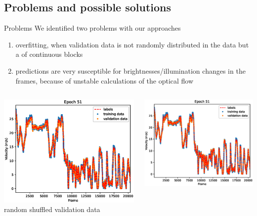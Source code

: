 \subsection{Problems and possible solutions}
\begin{frame}{Problems}
We identified two problems with our approaches
\begin{enumerate}
	\item overfitting, when validation data is not randomly distributed in the data but a of continuous blocks
	\item predictions are very susceptible for brightnesses/illumination changes in the frames, because of unstable calculations of the optical flow
\end{enumerate}
\begin{columns}[c]
	\begin{column}{0.5\textwidth}
		\begin{center}
		\includegraphics[width=\textwidth]{imgs/siamese_performance.eps}
		random shuffled validation data
		\end{center}
	\end{column}
	\begin{column}{0.5\textwidth}
		\begin{center}
		\includegraphics[width=\textwidth]{imgs/siamese_performance.eps}

\end{center}
\end{column}
\end{columns}
\end{frame}
